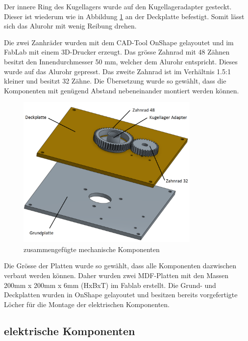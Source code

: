 Der innere Ring des Kugellagers wurde auf den Kugellageradapter gesteckt. Dieser ist wiederum wie in Abbildung \ref{fig:mechKomp} an der Deckplatte befestigt. Somit lässt sich das Alurohr mit wenig Reibung drehen.

Die zwei Zanhräder wurden mit dem CAD-Tool OnShape gelayoutet und im FabLab mit einem 3D-Drucker erzeugt. Das grösse Zahnrad mit 48 Zähnen besitzt den Innendurchmesser 50 mm, welcher dem Alurohr entspricht. Dieses wurde auf das Alurohr gepresst. Das zweite Zahnrad ist im Verhältnis 1.5:1 kleiner und besitzt 32 Zähne. Die Übersetzung wurde so gewählt, dass die Komponenten mit genügend Abstand nebeneinander montiert werden können.  

\begin{figure}[H]
	\centering
	\includegraphics[width=0.8\textwidth]{resources/mechKomp2.PNG}
	\caption{zusammengefügte mechanische Komponenten}
	\label{fig:mechKomp}
\end{figure} 

Die Grösse der Platten wurde so gewählt, dass alle Komponenten dazwischen verbaut werden können. Daher wurden zwei MDF-Platten mit den Massen 200mm x 200mm x 6mm (HxBxT) im Fablab erstellt. Die Grund- und Deckplatten wurden in OnShape gelayoutet und besitzen bereits vorgefertigte Löcher für die Montage der elektrischen Komponenten.


\subsection {elektrische Komponenten}
\label{sec:elekKomp}




